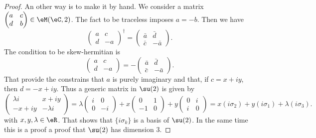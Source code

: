 \begin{proof}
    An other way is to make it by hand. We consider a matrix \( \begin{pmatrix}
        a    &   c    \\ 
        d    &   b    
    \end{pmatrix}\in \eM(\eC,2)\). The fact to be traceless imposes \( a=-b\). Then we have
    \begin{equation}
        \begin{pmatrix}
            a    &   c    \\ 
            d    &   -a    
        \end{pmatrix}^{\dag}=\begin{pmatrix}
            \bar a    &   \bar d    \\ 
            \bar c    &   -\bar a    
        \end{pmatrix}.
    \end{equation}
    The condition to be skew-hermitian is
    \begin{equation}
        \begin{pmatrix}
            a    &   c    \\ 
            d    &   -a    
        \end{pmatrix}=-\begin{pmatrix}
            \bar a    &   \bar d    \\ 
            \bar c    &   -\bar a    
        \end{pmatrix}.
    \end{equation}
    That provide the constrains that \( a\) is purely imaginary and that, if \( c=x+iy\), then \( d=-x+iy\). Thus a generic matrix in \( \su(2)\) is given by
    \begin{equation}
        \begin{pmatrix}
            \lambda i    &   x+iy    \\ 
            -x+iy    &   -\lambda i    
        \end{pmatrix}=\lambda\begin{pmatrix}
            i    &   0    \\ 
            0    &   -i    
        \end{pmatrix}+x\begin{pmatrix}
            0    &   1    \\ 
            -1    &   0    
        \end{pmatrix}+y\begin{pmatrix}
            0    &   i    \\ 
            i    &   0    
        \end{pmatrix}=x(i\sigma_2)+y(i\sigma_1)+\lambda(i\sigma_3).
    \end{equation}
    with \( x,y,\lambda\in \eR\). That shows that \(  \{ i\sigma_k \} \) is a basis of \( \su(2)\).  In the same time this is a proof a proof that \( \su(2)\) has dimension \( 3\).


\end{proof}

